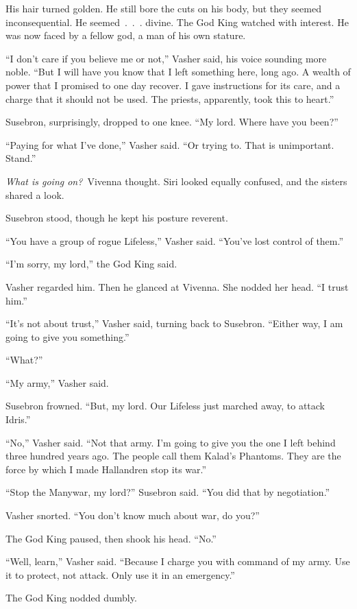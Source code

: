His hair turned golden. He still bore the cuts on his body, but they seemed inconsequential. He seemed~.~.~. divine. The God King watched with interest. He was now faced by a fellow god, a man of his own stature.

“I don’t care if you believe me or not,” Vasher said, his voice sounding more noble. “But I will have you know that I left something here, long ago. A wealth of power that I promised to one day recover. I gave instructions for its care, and a charge that it should not be used. The priests, apparently, took this to heart.”

Susebron, surprisingly, dropped to one knee. “My lord. Where have you been?”

“Paying for what I’ve done,” Vasher said. “Or trying to. That is unimportant. Stand.”

\textit{What is going on?}~Vivenna thought. Siri looked equally confused, and the sisters shared a look.

Susebron stood, though he kept his posture reverent.

“You have a group of rogue Lifeless,” Vasher said. “You’ve lost control of them.”

“I’m sorry, my lord,” the God King said.

Vasher regarded him. Then he glanced at Vivenna. She nodded her head. “I trust him.”

“It’s not about trust,” Vasher said, turning back to Susebron. “Either way, I am going to give you something.”

“What?”

“My army,” Vasher said.

Susebron frowned. “But, my lord. Our Lifeless just marched away, to attack Idris.”

“No,” Vasher said. “Not that army. I’m going to give you the one I left behind three hundred years ago. The people call them Kalad’s Phantoms. They are the force by which I made Hallandren stop its war.”

“Stop the Manywar, my lord?” Susebron said. “You did that by negotiation.”

Vasher snorted. “You don’t know much about war, do you?”

The God King paused, then shook his head. “No.”

“Well, learn,” Vasher said. “Because I charge you with command of my army. Use it to protect, not attack. Only use it in an emergency.”

The God King nodded dumbly.

